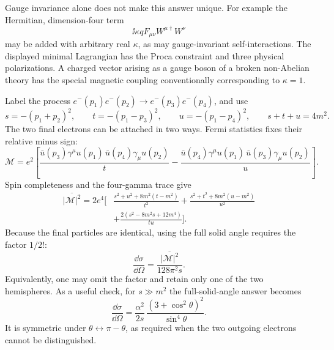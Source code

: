 \begin{enumerate}
Gauge invariance alone does not make this answer unique.  For example the
Hermitian, dimension-four term
\[
 \ii\kappa qF_{\mu\nu}W^{\mu\dagger}W^\nu
\]
may be added with arbitrary real \(\kappa\), as may gauge-invariant
self-interactions.  The displayed minimal Lagrangian has the Proca
constraint and three physical polarizations.  A charged vector arising as
a gauge boson of a broken non-Abelian theory has the special magnetic
coupling conventionally corresponding to \(\kappa=1\).

Label the process
\(e^-(p_1)e^-(p_2)\to e^-(p_3)e^-(p_4)\), and use
\[
 s=-(p_1+p_2)^2,\qquad
 t=-(p_1-p_3)^2,\qquad
 u=-(p_1-p_4)^2,\qquad s+t+u=4m^2 .
\]
The two final electrons can be attached in two ways.  Fermi statistics
fixes their relative minus sign:
\[
 \mathcal M=e^2\left[
 \frac{\bar u(p_3)\gamma^\mu u(p_1)\,
       \bar u(p_4)\gamma_\mu u(p_2)}{t}
 -\frac{\bar u(p_4)\gamma^\mu u(p_1)\,
       \bar u(p_3)\gamma_\mu u(p_2)}{u}
 \right].
\]
Spin completeness and the four-gamma trace give
\[
 \begin{split}
 \overline{|\mathcal M|^2}=2e^4\biggl[
 &\frac{s^2+u^2+8m^2(t-m^2)}{t^2}
 +\frac{s^2+t^2+8m^2(u-m^2)}{u^2}\\
 &+\frac{2(s^2-8m^2s+12m^4)}{tu}
 \biggr].
 \end{split}
\]
Because the final particles are identical, using the full solid angle
requires the factor \(1/2!\):
\[
 \boxed{\qquad
 \frac{\dd\sigma}{\dd\Omega}
 =\frac{\overline{|\mathcal M|^2}}{128\pi^2s}.
 \qquad}
\]
Equivalently, one may omit the factor and retain only one of the two
hemispheres.  As a useful check, for \(s\gg m^2\) the full-solid-angle
answer becomes
\[
 \boxed{\qquad
 \frac{\dd\sigma}{\dd\Omega}
 =\frac{\alpha^2}{2s}\,
 \frac{(3+\cos^2\theta)^2}{\sin^4\theta}.
 \qquad}
\]
It is symmetric under \(\theta\leftrightarrow\pi-\theta\), as required
when the two outgoing electrons cannot be distinguished.
\end{enumerate}
